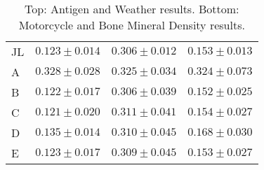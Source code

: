 \documentclass[twoside]{article} \usepackage{aistats2017}
\theoremstyle{definition}
\theoremstyle{theorem}
\begin{document}
\begin{table*}
\begin{center}
{\begin{tabular}{l|ccc}
									JL & $0.123 \pm 0.014$ & $\mathbf{0.306 \pm 0.012}$ & $0.153 \pm 0.013$ \\
									A & $0.328 \pm 0.028$ & $0.325 \pm 0.034$ & $0.324 \pm 0.073$ \\
									B & $0.122 \pm 0.017$ & $\mathbf{0.306 \pm 0.039}$ & $0.152 \pm 0.025$ \\
									C & $0.121 \pm 0.020$ & $0.311 \pm 0.041$ & $0.154 \pm 0.027$ \\
									D & $0.135 \pm 0.014$ & $0.310 \pm 0.045$ & $0.168 \pm 0.030$ \\
									E & $0.123 \pm 0.017$ & $0.309 \pm 0.045$ & $0.153 \pm 0.027$
								\end{tabular}}
							\end{center}
							\caption{Top: Antigen and Weather results. Bottom: Motorcycle and Bone Mineral Density results.}
							\label{table:results}
						\end{table*}
						
						
\end{document}
